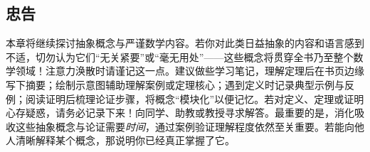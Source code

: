 
\subsection{忠告}

本章将继续探讨抽象概念与严谨数学内容。若你对此类日益抽象的内容和语言感到不适，切勿认为它们``无关紧要''或``毫无用处''——这些概念将贯穿全书乃至整个数学领域！注意力涣散时请谨记这一点。建议做些学习笔记，理解定理后在书页边缘写下摘要；绘制示意图辅助理解案例或定理核心；遇到定义时记录典型示例与反例；阅读证明后梳理论证步骤，将概念``模块化''以便记忆。若对定义、定理或证明心存疑惑，请务必记录下来！向同学、助教或教授寻求解答。最重要的是，消化吸收这些抽象概念与论证需要\emph{时间}，通过案例验证理解程度依然至关重要。若能向他人清晰解释某个概念，那说明你已经真正掌握了它。